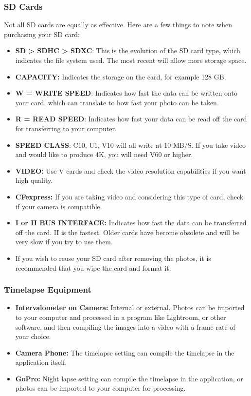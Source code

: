 \documentclass{article}
\newcommand{\contributed}[1]{%
    \par\noindent
    \begingroup
    \setlength{\leftskip}{1em}%
    \itshape
    Contributors: #1
    \par
    \endgroup
    \vspace{0.5em}
}
\begin{document}
\subsubsection{SD Cards}
Not all SD cards are equally as effective.   Here are a few things to note when purchasing your SD card:
\begin{itemize}
    \item \textbf{SD > SDHC > SDXC}: This is the evolution of the SD card type, which indicates the file system used. The most recent will allow more storage space.
    \item \textbf{CAPACITY:} Indicates the storage on the card, for example 128 GB.
    \item \textbf{W = WRITE SPEED}: Indicates how fast the data can be written onto your card, which can translate to how fast your photo can be taken.
    \item \textbf{R = READ SPEED}:  Indicates how fast your data can be read off the card for transferring to your computer.
    \item \textbf{SPEED CLASS}:  C10, U1, V10 will all write at 10 MB/S.  If you take video and would like to produce 4K, you will need V60 or higher.  
    \item \textbf{VIDEO: } Use V cards and check the video resolution capabilities if you want high quality. 
    \item \textbf{CFexpress:}  If you are taking video and considering this type of card, check if your camera is compatible.
    \item \textbf{I or II BUS INTERFACE:}  Indicates how fast the data can be transferred off the card.  II is the fastest.  Older cards have become obsolete and will be very slow if you try to use them.
    \item If you wish to reuse your SD card after removing the photos, it is recommended that you wipe the card and format it.
\end{itemize}

\subsubsection{Timelapse Equipment}

\begin{itemize}
    \item\textbf{Intervalometer on Camera:} Internal or external.  Photos can be imported to your computer and processed in a program like Lightroom, or other software, and then compiling the images into a video with a frame rate of your choice.

    \item\textbf{Camera Phone:}  The timelapse setting can compile the timelapse in the application itself.

    \item\textbf{GoPro:} Night lapse setting can compile the timelapse in the application, or photos can be imported to your computer for processing.

\end{itemize}
\end{document}
